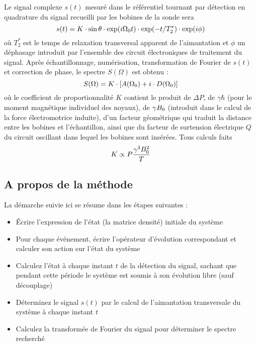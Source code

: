 Le signal complexe $s(t)$ mesuré dans le référentiel tournant par détection en
quadrature du signal recueilli par les bobines de la sonde sera
\begin{equation}
s(t) = K \cdot \sin\theta \cdot \exp(i \Omega_0 t) \cdot \exp(-t/T_2^*) \cdot \exp(i\phi)
\end{equation}
où $T_2^*$ est le temps de relaxation transversal apparent de l'aimantation et
$\phi$ un déphasage introduit par l'ensemble des circuit électroniques de
traitement du signal.
Après échantillonnage, numérisation, transformation de Fourier de $s(t)$ et correction de phase, 
le spectre $S(\Omega)$ est obtenu :
\begin{equation}
S(\Omega) = K \cdot \left[ A(\Omega_0) + i \cdot D(\Omega_0) \right]
\end{equation}
où le coefficient de proportionnalité $K$ contient le produit de 
$\Delta P$, de $\gamma\hbar$ (pour le moment magnétique individuel des noyaux), de
$\gamma B_0$ (introduit dans le calcul de la force électromotrice induite),
d'un facteur géométrique qui traduit la distance entre les bobines et l'échantillon,
ainsi que du facteur de surtension électrique $Q$ du circuit oscillant dans lequel
les bobines sont insérées.
Tous calculs faits
\begin{equation}
K \propto P \frac{\gamma^3 B_0^2}{T}
\end{equation}

\subsection{A propos de la méthode}
La démarche suivie ici se résume dans les étapes suivantes :
\begin{itemize}
\item Écrire l'expression de l'état (la matrice densité) initiale du système
\item Pour chaque événement, écrire l'opérateur d'évolution correspondant et calculer
son action sur l'état du système
\item Calculez l'état à chaque instant $t$ de la détection du signal, sachant que pendant cette
période le système est soumis à son évolution libre (sauf découplage)
\item Déterminez le signal $s(t)$ par le calcul de
l'aimantation transversale du système à chaque instant $t$
\item Calculez la transformée de Fourier du signal pour déterminer le spectre recherché
\end{itemize}

